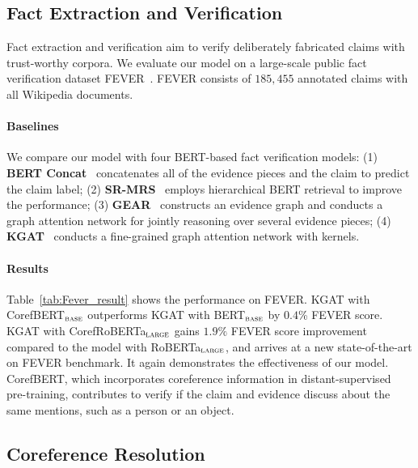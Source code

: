 \documentclass[11pt,a4paper]{article}
\newcommand\BASESIZE{$_{\small \textsc{base}}$\xspace}
\newcommand\LARGESIZE{$_{\small \textsc{large}}$\xspace}
\begin{document}
\subsection{Fact Extraction and Verification}
Fact extraction and verification aim to verify deliberately fabricated claims with trust-worthy corpora. We evaluate our model  on a large-scale public fact verification dataset FEVER~\citep{Fever}. FEVER consists of $185,455$ annotated claims with all Wikipedia documents.

\vspace{-0.1em}
\paragraph{Baselines}
We compare our model with four BERT-based fact verification models: (1) \textbf{BERT Concat}~\citep{Zhoujie} concatenates all of the evidence pieces and the claim to predict the claim label; (2) \textbf{SR-MRS}~\citep{SR-MRS} employs hierarchical BERT retrieval to improve the performance; (3) \textbf{GEAR}~\citep{Zhoujie} constructs an evidence graph and conducts a graph attention network for jointly reasoning over several evidence pieces; (4) \textbf{KGAT}~\citep{Zhenghao}  conducts a fine-grained graph attention network with kernels.

\vspace{-0.1em}
\paragraph{Results}
Table~\ref{tab:Fever_result} shows the performance on FEVER. KGAT with CorefBERT\BASESIZE outperforms KGAT with BERT\BASESIZE by $0.4$\% FEVER score. KGAT with CorefRoBERTa\LARGESIZE gains $1.9\%$ FEVER score improvement compared to the model with RoBERTa\LARGESIZE, and arrives at a new state-of-the-art on FEVER benchmark. It again demonstrates the effectiveness of our model. CorefBERT, which incorporates coreference information in distant-supervised pre-training, contributes to verify if the claim and evidence discuss about the same mentions, such as a person or an object. 

 







\subsection{Coreference Resolution}
\end{document}
